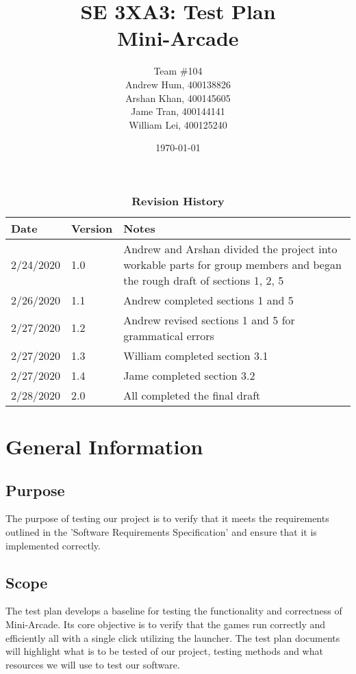 \documentclass[12pt, titlepage]{article}
\title{SE 3XA3: Test Plan\\Mini-Arcade}
\author{Team \#104
		\\ Andrew Hum, 400138826
		\\ Arshan Khan, 400145605
		\\ Jame Tran, 400144141
		\\ William Lei, 400125240
}
\date{\today}
\begin{document}
\maketitle

\tableofcontents
\listoftables
\listoffigures

\begin{table}[hbp]
\caption{\bf Revision History}
\begin{tabularx}{\textwidth}{p{3cm}p{2cm}X}
\toprule {\bf Date} & {\bf Version} & {\bf Notes}\\
\midrule
2/24/2020 & 1.0 & Andrew and Arshan divided the project into workable parts for group members and began the rough draft of sections 1, 2, 5\\
2/26/2020 & 1.1 & Andrew completed sections 1 and 5\\
2/27/2020 & 1.2 & Andrew revised sections 1 and 5 for grammatical errors\\
2/27/2020 & 1.3 & William completed section 3.1\\
2/27/2020 & 1.4 & Jame completed section 3.2\\
2/28/2020 & 2.0 & All completed the final draft\\
\bottomrule
\end{tabularx}
\end{table}

\newpage


\section{General Information}

\subsection{Purpose}

The purpose of testing our project is to verify that it meets the requirements outlined in the 'Software Requirements Specification' and ensure that it is implemented correctly.

\subsection{Scope}

The test plan develops a baseline for testing the functionality and correctness of Mini-Arcade. Its core objective is to verify that the games run correctly and efficiently all with a single click utilizing the launcher. The test plan documents will highlight what is to be tested of our project, testing methods and what resources we will use to test our software.
\end{document}
